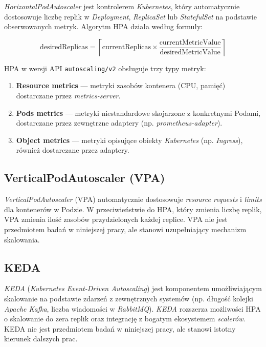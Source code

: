\textit{HorizontalPodAutoscaler} jest kontrolerem \textit{Kubernetes}, który automatycznie dostosowuje liczbę replik w \textit{Deployment}, \textit{ReplicaSet} lub \textit{StatefulSet} na podstawie obserwowanych metryk. Algorytm HPA działa według formuły:

\begin{equation}
  \text{desiredReplicas} = \left\lceil \text{currentReplicas} \times \frac{\text{currentMetricValue}}{\text{desiredMetricValue}} \right\rceil
\end{equation}

HPA w wersji API \texttt{autoscaling/v2} obsługuje trzy typy metryk:

\begin{enumerate}
  \item \textbf{Resource metrics} — metryki zasobów kontenera (CPU, pamięć) dostarczane przez \textit{metrics-server}.
  \item \textbf{Pods metrics} — metryki niestandardowe skojarzone z konkretnymi Podami, dostarczane przez zewnętrzne adaptery (np. \textit{prometheus-adapter}).
  \item \textbf{Object metrics} — metryki opisujące obiekty \textit{Kubernetes} (np. \textit{Ingress}), również dostarczane przez adaptery.
\end{enumerate}

\subsection{VerticalPodAutoscaler (VPA)}

\textit{VerticalPodAutoscaler} (VPA) automatycznie dostosowuje \textit{resource requests} i \textit{limits} dla kontenerów w Podzie. W przeciwieństwie do HPA, który zmienia liczbę replik, VPA zmienia ilość zasobów przydzielonych każdej replice. VPA nie jest przedmiotem badań w niniejszej pracy, ale stanowi uzupełniający mechanizm skalowania.

\subsection{KEDA}

\textit{KEDA} (\textit{Kubernetes Event-Driven Autoscaling}) jest komponentem umożliwiającym skalowanie na podstawie zdarzeń z zewnętrznych systemów (np. długość kolejki \textit{Apache Kafka}, liczba wiadomości w \textit{RabbitMQ}). \textit{KEDA} rozszerza możliwości HPA o skalowanie do zera replik oraz integrację z bogatym ekosystemem \textit{scalerów}. KEDA nie jest przedmiotem badań w niniejszej pracy, ale stanowi istotny kierunek dalszych prac.

